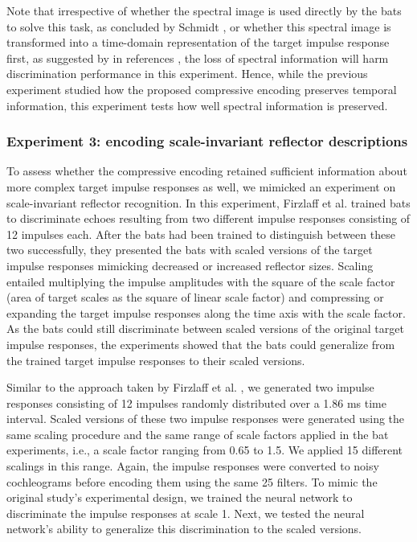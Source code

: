 \documentclass[10pt,letterpaper]{article}
\begin{document}
Note that irrespective of whether the spectral image is used directly by the bats to solve this task, as concluded by Schmidt \cite{Schmidt1992}, or whether this spectral image is transformed into a time-domain representation of the target impulse response first, as suggested by in references \cite{Saillant1993,Matsuo2004}, the loss of spectral information will harm discrimination performance in this experiment. Hence, while the previous experiment studied how the proposed compressive encoding preserves temporal information, this experiment tests how well spectral information is preserved.

\subsubsection{Experiment 3: encoding scale-invariant reflector descriptions}

To assess whether the compressive encoding retained sufficient information about more complex target impulse responses as well, we mimicked an experiment on scale-invariant reflector recognition. In this experiment, Firzlaff et al. \cite{Firzlaff2007} trained bats to discriminate echoes resulting from two different impulse responses consisting of 12 impulses each. After the bats had been trained to distinguish between these two successfully, they presented the bats with scaled versions of the target impulse responses mimicking decreased or increased reflector sizes. Scaling entailed multiplying the impulse amplitudes with the square of the scale factor (area of target scales as the square of linear scale factor) and compressing or expanding the target impulse responses along the time axis with the scale factor. As the bats could still discriminate between scaled versions of the original target impulse responses, the experiments showed that the bats could generalize from the trained target impulse responses to their scaled versions.

Similar to the approach taken by  Firzlaff et al. \cite{Firzlaff2007}, we generated two impulse responses consisting of 12 impulses randomly distributed over a 1.86 ms time interval. Scaled versions of these two impulse responses were generated using the same scaling procedure and the same range of scale factors applied in the bat experiments, i.e., a scale factor ranging from 0.65 to 1.5. We applied 15 different scalings in this range. Again, the impulse responses were converted to noisy cochleograms before encoding them using the same 25 filters. To mimic the original study's experimental design, we trained the neural network to discriminate the impulse responses at scale 1. Next, we tested the neural network's ability to generalize this discrimination to the scaled versions.
\end{document}
